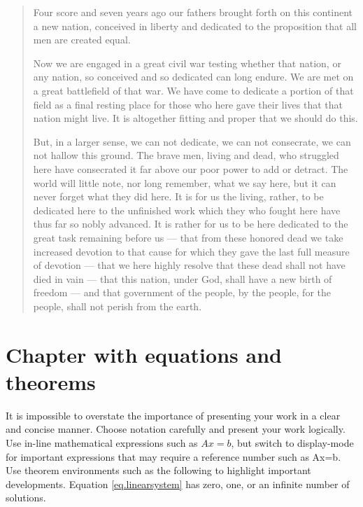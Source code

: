 \documentclass[11pt]{report}
\begin{document}
\begin{quote}
  \begin{singlespace}
  Four score and seven years ago our fathers brought forth on this continent a new nation, conceived in liberty and dedicated to the proposition that all men are created equal.
  
  Now we are engaged in a great civil war testing whether that nation, or any nation, so conceived and so dedicated can long endure.  We are met on a great battlefield of that war.  We have come to dedicate a portion of that field as a final resting place for those who here gave their lives that that nation might live.  It is altogether fitting and proper that we should do this.
  
  But, in a larger sense, we can not dedicate, we can not consecrate, we can not hallow this ground.  The brave men, living and dead, who struggled here have consecrated it far above our poor power to add or detract.  The world will little note, nor long remember, what we say here, but it can never forget what they did here.  It is for us the living, rather, to be dedicated here to the unfinished work which they who fought here have thus far so nobly advanced.  It is rather for us to be here dedicated to the great task remaining before us --- that from these honored dead we take increased devotion to that cause for which they gave the last full measure of devotion --- that we here highly resolve that these dead shall not have died in vain --- that this nation, under God, shall have a new birth of freedom --- and that government of the people, by the people, for the people, shall not perish from the earth.
  \end{singlespace}
\end{quote}

\chapter{Chapter with equations and theorems}

It is impossible to overstate the importance of presenting your work in a clear and concise manner.  Choose notation carefully and present your work logically.  Use in-line mathematical expressions such as $Ax=b$, but switch to display-mode for important expressions that may require a reference number such as
\bequation\label{eq.linearsystem}
  Ax=b.
\eequation
Use theorem environments such as the following to highlight important developments.
\btheorem
  Equation \eqref{eq.linearsystem} has zero, one, or an infinite number of solutions.
\etheorem
\end{document}
